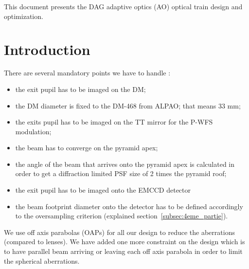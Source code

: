 \documentclass[12pt,a4paper]{article}
\begin{document}
This document presents the DAG adaptive optics (AO) optical train design and optimization.

\section{Introduction}
There are several mandatory points we have to handle :
\begin{itemize}
	\item the exit pupil has to be imaged on the DM;
	\item the DM diameter is fixed to the DM-468 from ALPAO; that means \diameter $33$ mm;
	\item the exits pupil has to be imaged on the TT mirror for the P-WFS modulation;
	\item the beam has to converge on the pyramid apex;
	\item the angle of the beam that arrives onto the pyramid apex is calculated in order to get a diffraction limited PSF size of 2 times the pyramid roof;
	\item the exit pupil has to be imaged onto the EMCCD detector
	\item the beam footprint diameter onto the detector has to be defined accordingly to the oversampling criterion (explained section~\ref{subsec:4eme_partie}).
\end{itemize}

We use off axis parabolas (OAPs) for all our design to reduce the aberrations (compared to lenses).
We have added one more constraint on the design which is to have parallel beam arriving or leaving each off axis parabola in order to limit the spherical aberrations.\\
\end{document}
